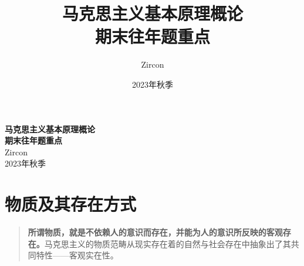 \documentclass[
]{article}
\title{\Huge \textbf{马克思主义基本原理概论\\期末往年题重点}}
\author{Zircon}
\date{2023年秋季}
\begin{document}
\begin{titlepage}
  \vspace*{\fill}
  \begin{center}
    {\Huge\heiti \textbf{马克思主义基本原理概论\\期末往年题重点}}\\[30mm]
    {\Large Zircon}\\[5mm]
    2023年秋季
\end{center}
  \vspace*{\fill}
\end{titlepage}

\newpage
{\footnotesize \tableofcontents}

\hypertarget{ux7269ux8d28ux53caux5176ux5b58ux5728ux65b9ux5f0f}{%
\section{物质及其存在方式}\label{ux7269ux8d28ux53caux5176ux5b58ux5728ux65b9ux5f0f}}

\begin{quote}
\textbf{所谓物质，就是不依赖人的意识而存在，并能为人的意识所反映的客观存在。}马克思主义的物质范畴从现实存在着的自然与社会存在中抽象出了其共同特性------客观实在性。
\end{quote}
\end{document}
